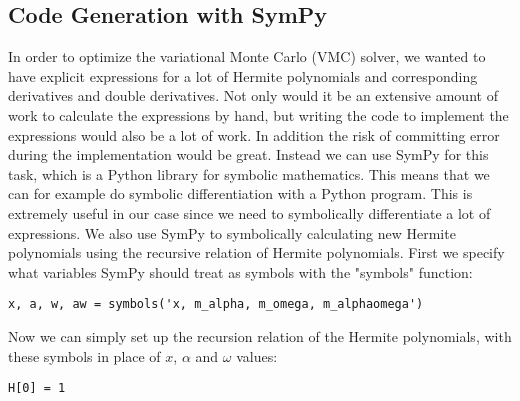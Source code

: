 \documentclass[../main.tex]{subfiles}
\begin{document}
\begin{appendices}
\chapter{Code Generation with SymPy}

In order to optimize the variational Monte Carlo (VMC) solver, we wanted to have explicit expressions for a lot of Hermite polynomials and corresponding derivatives and double derivatives. Not only would it be an extensive amount of work to calculate the expressions by hand, but writing the code to implement the expressions would also be a lot of work. In addition the risk of committing error during the implementation would be great. Instead we can use SymPy\cite{SymPy} for this task, which is a Python library for symbolic mathematics. This means that we can for example do symbolic differentiation with a Python program. This is extremely useful in our case since we need to symbolically differentiate a lot of expressions. We also use SymPy to symbolically calculating new Hermite polynomials using the recursive relation of Hermite polynomials. First we specify what variables SymPy should treat as symbols with the "symbols" function:
\lstset{language=python}
\begin{lstlisting}[caption={}]
x, a, w, aw = symbols('x, m_alpha, m_omega, m_alphaomega')
\end{lstlisting}
Now we can simply set up the recursion relation of the Hermite polynomials, with these symbols in place of $x$, $\alpha$ and $\omega$ values:
\lstset{language=python}
\begin{lstlisting}[caption={}]
H[0] = 1


\end{lstlisting}
\end{appendices}
\end{document}
